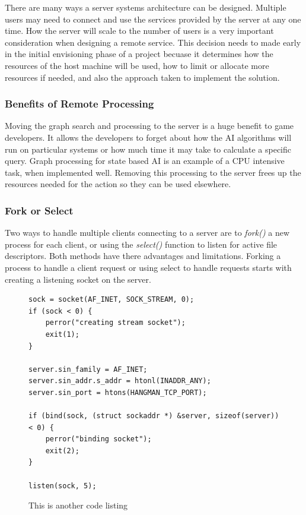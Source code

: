 \documentclass[12pt,a4paper,titlepage]{article}
\begin{document}
There are many ways a server systems architecture can be designed. Multiple users may need to connect and use the services provided by the server at any one time. How the server will scale to the number of users is a very important consideration when designing a remote service. This decision needs to made early in the initial envisioning phase of a project becuase it determines how the resources of the host machine will be used, how to limit or allocate more resources if needed, and also the approach taken to implement the solution.\\

\subsubsection{Benefits of Remote Processing}

Moving the graph search and processing to the server is a huge benefit to game developers. It allows the developers to forget about how the AI algorithms will run on particular systems or how much time it may take to calculate a specific query. Graph processing for state based AI is an example of a CPU intensive task, when implemented well. Removing this processing to the server frees up the resources needed for the action so they can be used elsewhere.\\


\subsubsection{Fork or Select}

Two ways to handle multiple clients connecting to a server are to \textit{fork()} a new process for each client, or using the \textit{select()} function to listen for active file descriptors. Both methods have there advantages and limitations. Forking a process to handle a client request or using select to handle requests starts with creating a listening socket on the server. 

\begin{figure}[H]
\begin{lstlisting}
sock = socket(AF_INET, SOCK_STREAM, 0); 
if (sock < 0) {
	perror("creating stream socket");
	exit(1);
}

server.sin_family = AF_INET;
server.sin_addr.s_addr = htonl(INADDR_ANY);
server.sin_port = htons(HANGMAN_TCP_PORT);

if (bind(sock, (struct sockaddr *) &server, sizeof(server)) < 0) {
	perror("binding socket");
	exit(2);
}

listen(sock, 5);
\end{lstlisting}
	\caption{This is another code listing \cite{stevensunp}}
	\label{code:raig header source}
\end{figure}
\end{document}
